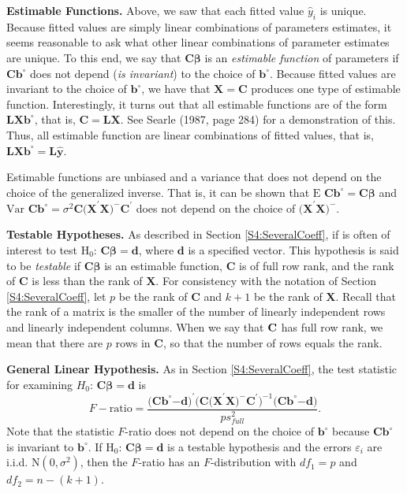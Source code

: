 \textbf{Estimable Functions.} Above, we saw that each fitted value $\hat{y}%
_i$ is unique. Because fitted values are simply linear combinations
of parameters estimates, it seems reasonable to ask what other
linear
combinations of parameter estimates are unique. To this end, we say that $%
\mathbf{C \boldsymbol \beta }$ is an \textit{estimable function} of parameters if $%
\mathbf{Cb}^{\circ }$ does not depend (\emph{is invariant}) to the
choice of $\mathbf{b}^{\circ }$. Because fitted values are invariant
to the choice of $\mathbf{b}^{\circ }$, we have that
$\mathbf{X}=\mathbf{C}$ produces one type of estimable function.
Interestingly, it turns out that all estimable functions are of the
form $\mathbf{LXb}^{\circ }$, that is, $\mathbf{C}=\mathbf{LX}$. See
Searle (1987, page 284) for a demonstration of this. Thus, all
estimable
function are linear combinations of fitted values, that is, $\mathbf{LXb}%
^{\circ }=\mathbf{L\hat{y}}$.

Estimable functions are unbiased and a variance that does not depend
on the choice of the generalized inverse. That is, it can be shown
that $ \text{E }\mathbf{Cb}^{\circ }=\mathbf{C \boldsymbol
\beta}$ and $ \text{Var }\mathbf{Cb}^{\circ }=\sigma^2\mathbf{C(X}^{\prime}\mathbf{X)}%
^{-}\mathbf{C}^{\prime}$ does not depend on the choice of $\mathbf{(X}%
^{\prime}\mathbf{X)}^{-}.$

\textbf{Testable Hypotheses.} As described in Section
\ref{S4:SeveralCoeff}, if is often of interest to test H$_0$:
$\mathbf{C \boldsymbol \beta }=\mathbf{d}$, where $\mathbf{d}$ is a
specified vector. This hypothesis is said to be \textit{testable} if
$\mathbf{C \boldsymbol \beta }$ is an estimable function,
$\mathbf{C} $ is of full row rank, and the rank of $\mathbf{C}$ is
less than the rank of $\mathbf{X}$. For consistency with the
notation of Section \ref{S4:SeveralCoeff}, let $p$ be the rank of
$\mathbf{C}$ and $k+1$ be the rank of $\mathbf{X}$. Recall that the
rank of a matrix is the smaller of the number of linearly
independent rows and linearly independent columns. When we say that $\mathbf{%
C}$ has full row rank, we mean that there are $p$ rows in
$\mathbf{C}$, so that the number of rows equals the rank.

\textbf{General Linear Hypothesis.} As in Section
\ref{S4:SeveralCoeff}, the test statistic for examining $H_0$:
$\mathbf{C \boldsymbol \beta}=\mathbf{d}$ is
\begin{equation*}
F-\text{ratio}=\frac{\mathbf{(Cb}^{\circ }\mathbf{-d)}^{\prime}\mathbf{(C(X}%
^{\prime}\mathbf{X)}^{-}\mathbf{C}^{\prime}\mathbf{)}^{-1}\mathbf{(Cb}%
^{\circ }\mathbf{-d)}}{ps_{full}^2}.
\end{equation*}
Note that the statistic $F$-ratio does not depend on the choice of
$\mathbf{b}^{\circ}$ because $\mathbf{C b}^{\circ}$ is invariant to
$\mathbf{b}^{\circ}$. If H$_0$: $\mathbf{C \boldsymbol \beta
}=\mathbf{d}$ is a testable hypothesis and the errors
$\varepsilon_i$ are i.i.d. N$(0,\sigma^2)$, then the $F$-ratio has
an $F$-distribution with $df_1=p$ and $df_2=n-(k+1)$.

